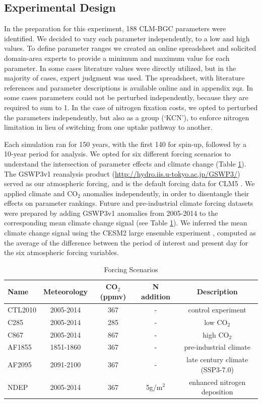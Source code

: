 \documentclass[draft]{agujournal2019}
\begin{document}
\subsection{Experimental Design}
In the preparation for this experiment, 188 CLM-BGC parameters were identified. We decided to vary each parameter independently, to a low and high values. To define parameter ranges we created an online spreadsheet and solicited domain-area experts to provide a minimum and maximum value for each parameter. In some cases literature values were directly utilized, but in the majority of cases, expert judgment was used. The spreadsheet, with literature references and parameter descriptions is available online and in appendix zqz. In some cases parameters could not be perturbed independently, because they are required to sum to 1. In the case of nitrogen fixation costs, we opted to perturbed the parameters independently, but also as a group (`KCN'), to enforce nitrogen limitation in lieu of switching from one uptake pathway to another.

Each simulation ran for 150 years, with the first 140 for spin-up, followed by a 10-year period for analysis. We opted for six different forcing scenarios to understand the intersection of parameter effects and climate change (Table \ref{tab:exps}). The GSWP3v1 reanalysis product (\url{http://hydro.iis.u-tokyo.ac.jp/GSWP3/}) served as our atmospheric forcing, and is the default forcing data for CLM5 \cite{lawrence2019}. We applied climate and CO$_2$ anomalies independently, in order to disentangle their effects on parameter rankings. Future and pre-industrial climate forcing datasets were prepared by adding GSWP3v1 anomalies from 2005-2014 to the corresponding mean climate change signal (see Table \ref{tab:exps}). We inferred the mean climate change signal using the CESM2 large ensemble experiment \cite{rodgers2021}, computed as the average of the difference between the period of interest and present day for the six atmospheric forcing variables.

\label{sect:exps}
 \begin{table}[h]
 \caption{Forcing Scenarios}
 \centering
 \begin{tabular}{l c c c c}
 \hline
  Name  & Meteorology & CO$_2$ (ppmv) & N addition & Description \\
 \hline
   CTL2010  & 2005-2014 & 367 & - & control experiment\\
   C285        & 2005-2014 & 285 & - & low CO$_2$ \\
   C867        & 2005-2014 & 867 & - & high CO$_2$ \\
   AF1855    & 1851-1860 & 367 & - & pre-industrial climate \\
   AF2095    & 2091-2100 & 367 & - & late century climate (SSP3-7.0) \\
   NDEP      & 2005-2014 & 367 & 5g/m$^2$ & enhanced nitrogen deposition \\
 \hline
 \end{tabular}
 \label{tab:exps}
 \end{table}
\end{document}
